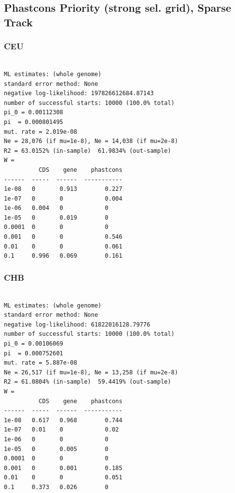\documentclass[11pt]{article}
\begin{document}
\subsection{Phastcons Priority (strong sel. grid), Sparse Track}
\subsubsection*{CEU}
\begin{minipage}{\linewidth}\begin{footnotesize}
\begin{verbatim}

ML estimates: (whole genome)
standard error method: None
negative log-likelihood: 197826612684.87143
number of successful starts: 10000 (100.0% total)
pi_0 = 0.00112308
pi  = 0.000801495
mut. rate = 2.019e-08 
Ne = 28,076 (if mu=1e-8), Ne = 14,038 (if mu=2e-8)
R2 = 63.0152% (in-sample)  61.9834% (out-sample)
W = 
          CDS    gene    phastcons
------  -----  ------  -----------
1e-08   0       0.913        0.227
1e-07   0       0            0.004
1e-06   0.004   0            0
1e-05   0       0.019        0
0.0001  0       0            0
0.001   0       0            0.546
0.01    0       0            0.061
0.1     0.996   0.069        0.161
\end{verbatim}
\end{footnotesize}\end{minipage}


\subsubsection*{CHB}
\begin{minipage}{\linewidth}\begin{footnotesize}
\begin{verbatim}

ML estimates: (whole genome)
standard error method: None
negative log-likelihood: 61822016128.79776
number of successful starts: 10000 (100.0% total)
pi_0 = 0.00106069
pi  = 0.000752601
mut. rate = 5.887e-08 
Ne = 26,517 (if mu=1e-8), Ne = 13,258 (if mu=2e-8)
R2 = 61.0804% (in-sample)  59.4419% (out-sample)
W = 
          CDS    gene    phastcons
------  -----  ------  -----------
1e-08   0.617   0.968        0.744
1e-07   0.01    0            0.02
1e-06   0       0            0
1e-05   0       0.005        0
0.0001  0       0            0
0.001   0       0.001        0.185
0.01    0       0            0.051
0.1     0.373   0.026        0
\end{verbatim}
\end{footnotesize}\end{minipage}
\end{document}
